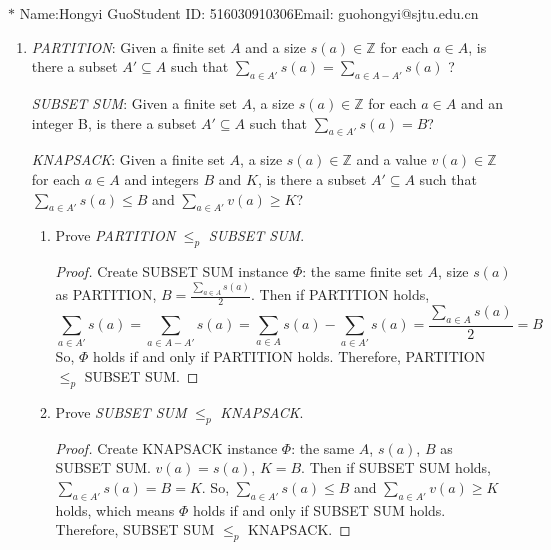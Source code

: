 \documentclass[12pt,a4paper]{article}
\theoremstyle{definition}
\begin{document}
\noindent

\noindent{}

\begin{center}
\footnotesize{\color{blue}$*$ Name:Hongyi Guo\quad Student ID: 516030910306\quad Email: guohongyi@sjtu.edu.cn}
\end{center}

\begin{enumerate}
\item
\emph{PARTITION}: Given a finite set $A$ and a size $s(a) \in \mathbb{Z}$ for each $a \in A$, is there a subset $A' \subseteq A$ such that $\sum_{a \in A'}s(a) = \sum_{a \in A-A'}s(a)$ ?

\emph{SUBSET SUM}: Given a finite set $A$, a size $s(a) \in \mathbb{Z}$ for each $a \in A$ and an integer B, is there a subset $A' \subseteq A$ such that $\sum_{a \in A'}s(a) = B$?

\emph{KNAPSACK}: Given a finite set $A$, a size $s(a) \in \mathbb{Z}$ and a value $v(a) \in \mathbb{Z}$ for each $a \in A$ and integers $B$ and $K$, is there a subset $A' \subseteq A$ such that $\sum_{a \in A'}s(a) \leq B$ and $\sum_{a \in A'}v(a) \geq K$?

\begin{enumerate}
\item
Prove \emph{PARTITION} $\leq_p$ \emph{SUBSET SUM}.

\begin{proof}
	Create SUBSET SUM instance $\Phi$: the same finite set $A$, size $s(a)$ as PARTITION, $B=\frac{\sum_{a \in A}s(a)}{2}$. Then if PARTITION holds, 
	$$
	\sum_{a \in A'}s(a) = \sum_{a \in A-A'}s(a) = \sum_{a \in A}s(a) - \sum_{a \in A'}s(a) = \frac{\sum_{a \in A}s(a)}{2} = B
	$$
	So, $\Phi$ holds if and only if PARTITION holds. Therefore, PARTITION $\leq_p$ SUBSET SUM.
	
\end{proof}

\item
Prove \emph{SUBSET SUM} $\leq_p$ \emph{KNAPSACK}.

\begin{proof}
	Create KNAPSACK instance $\Phi$: the same $A$, $s(a)$, $B$ as SUBSET SUM. $v(a)=s(a)$, $K=B$. Then if SUBSET SUM holds, $\sum_{a \in A'}s(a) = B = K$. So, $\sum_{a \in A'}s(a) \leq B$ and $\sum_{a \in A'}v(a) \geq K$ holds, which means $\Phi$ holds if and only if SUBSET SUM holds. Therefore, SUBSET SUM $\leq_p$ KNAPSACK.
	

\end{proof}
\end{enumerate}
\end{enumerate}
\end{document}
